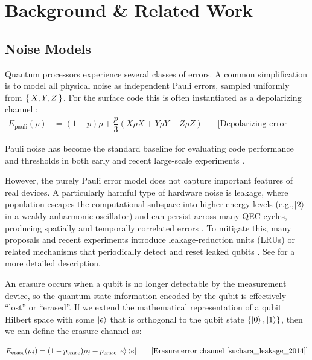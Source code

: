 \documentclass[11pt, notitlepage, letterpaper]{article}
\begin{document}
\section{Background \& Related Work}

\subsection{Noise Models}
Quantum processors experience several classes of errors. A common simplification is to model all physical noise as independent Pauli errors, sampled uniformly from $\set{X,Y,Z}$. For the surface code this is often instantiated as a depolarizing channel \cite{fowler_surface_2012}\cite{pesah_interactive_2023}:
\begin{align}E_{\text{pauli}}(\rho) & = (1-p)\rho + \dfrac{p}{3}(X\rho X + Y\rho Y + Z\rho Z) & \quad \text{[Depolarizing error channel]}
\end{align}

Pauli noise has become the standard baseline for evaluating code performance and thresholds in both early and recent large-scale experiments \cite{fowler_surface_2012}\cite{acharya_quantum_2025}.


However, the purely Pauli error model does not capture important features of real devices. A particularly harmful type of hardware noise is leakage, where population escapes the computational subspace into higher energy levels (e.g.,$\ket{2}$ in a weakly anharmonic oscillator) and can persist across many QEC cycles, producing spatially and temporally correlated errors \cite{suchara_leakage_2014}\cite{wilen_correlated_2021}\cite{miao_overcoming_nodate}\cite{yang_coupler-assisted_2024}. To mitigate this, many proposals and recent experiments introduce leakage-reduction units (LRUs) or related mechanisms that periodically detect and reset leaked qubits \cite{suchara_leakage_2014}. See  for a more detailed description.

 An erasure occurs when a qubit is no longer detectable by the measurement device, so the quantum state information encoded by the qubit is effectively ``lost'' or ``erased''. If we extend the mathematical representation of a qubit Hilbert space with some $\ket{e}$ that is orthogonal to the qubit state $\{\ket{0}, \ket{1}\}$, then we can define the erasure channel as:

\begin{align}E_{\text{erase}}(\rho_j) & = (1-p_{\text{erase}})\rho_j + p_{\text{erase}}\ket{e}\bra{e} & \quad \text{[Erasure error channel \cite{suchara_leakage_2014}]}
\end{align}
\end{document}
